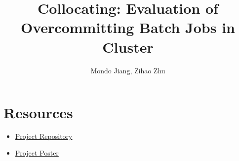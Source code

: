 \documentclass[pdftex,twocolumn,10pt,letterpaper]{article}
\begin{document}
\title{Collocating: Evaluation of Overcommitting Batch Jobs in Cluster}
\author{Mondo Jiang, Zihao Zhu}
\date{}


\maketitle













\section{Resources}

\begin{itemize}
    \item \href{https://github.com/uwm-cs744-24spring-project-team/crispy-octo}{Project Repository}
\item \href{https://docs.google.com/presentation/d/15ze8vMHdD7UokVdRE1VU1tw3WA-QlqWS/edit?usp=sharing&ouid=111359471154793691784&rtpof=true&sd=true}{Project Poster}
\end{itemize}



{


}
\end{document}
